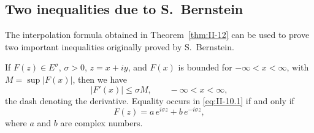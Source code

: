 \subsection*{Two inequalities due to S.\ Bernstein}
\noindent The interpolation formula obtained in Theorem~\ref{thm:II-12} can be used to prove two important inequalities originally proved by S.\ Bernstein.

\begin{theorem}[S.\ Bernstein]\label{thm:II-13}
If $F(z)\in E^{\sigma}$, $\sigma>0$, $z=x+iy$, and $F(x)$ is bounded for $-\infty<x<\infty$, with $M=\sup|F(x)|$, then we have
\begin{equation}\tag{10.1}\label{eq:II-10.1}
|F'(x)|\le\sigma M,\qquad-\infty<x<\infty,
\end{equation}
the dash denoting the derivative. Equality occurs in \eqref{eq:II-10.1} if and only if
\begin{equation}\tag{10.2}\label{eq:II-10.2}
F(z)=a\,e^{i\sigma z}+b\,e^{-i\sigma z},
\end{equation}
where $a$ and $b$ are complex numbers.
\end{theorem}

